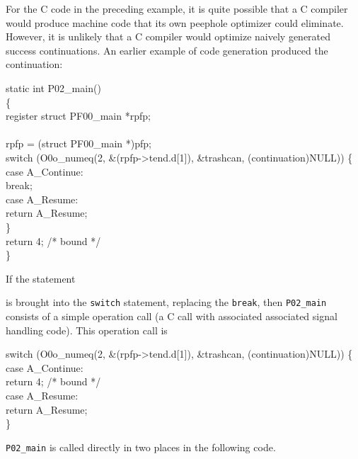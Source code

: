For the C code in the preceding example, it is quite possible that a C
compiler would produce machine code that its own peephole optimizer
could eliminate. However, it is unlikely that a C compiler would
optimize naively generated success continuations. An earlier example
of code generation produced the continuation:

\goodbreak
\begin{iconcode}
static int P02\_main()\\
\{\\
\>register struct PF00\_main *rpfp;\\
\\
\>rpfp = (struct PF00\_main *)pfp;\\
\>switch (O0o\_numeq(2, \&(rpfp->tend.d[1]), \&trashcan, (continuation)NULL)) \{\\
\>\>case A\_Continue:\\
\>\>\>break;\\
\>\>case A\_Resume:\\
\>\>\>return A\_Resume;\\
\>\>\}\\
\>return 4; /* bound */\\
\}\\
\end{iconcode}

\noindent
If the statement 


\noindent
is brought into the \texttt{switch} statement, replacing the
\texttt{break}, then \texttt{P02\_main} consists of a simple operation
call (a C call with associated associated signal handling code). This
operation call is

\goodbreak
\begin{iconcode}
switch (O0o\_numeq(2, \&(rpfp->tend.d[1]), \&trashcan, (continuation)NULL)) \{\\
\>case A\_Continue:\\
\>\>return 4; /* bound */\\
\>case A\_Resume:\\
\>\>return A\_Resume;\\
\}\\
\end{iconcode}

\noindent
\texttt{P02\_main} is called directly in two places in the following code. 

